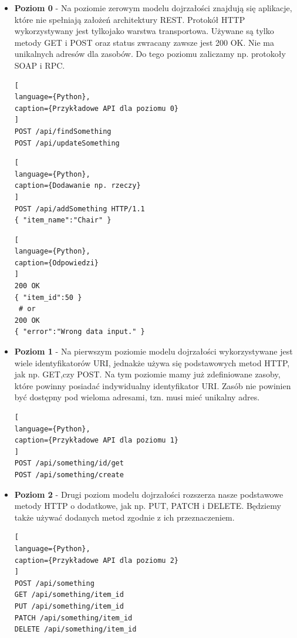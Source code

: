 \documentclass[oneside,polski,logo,indent]{amuthesis}
\begin{document}
\begin{itemize}
\item \textbf{Poziom 0} - Na poziomie zerowym modelu dojrzałości znajdują się aplikacje, które nie spełniają założeń architektury REST. Protokół HTTP wykorzystywany jest tylko\break jako warstwa transportowa. Używane są tylko metody GET i POST oraz status zwracany zawsze jest 200 OK. Nie ma unikalnych adresów dla zasobów. Do tego poziomu zaliczamy np. protokoły SOAP i RPC.

\begin{lstlisting}[
language={Python},
caption={Przykładowe API dla poziomu 0}
]
POST /api/findSomething
POST /api/updateSomething
\end{lstlisting}

\begin{lstlisting}[
language={Python},
caption={Dodawanie np. rzeczy}
]
POST /api/addSomething HTTP/1.1
{ "item_name":"Chair" }
\end{lstlisting}

\begin{lstlisting}[
language={Python},
caption={Odpowiedzi}
]
200 OK
{ "item_id":50 }
 # or
200 OK
{ "error":"Wrong data input." }
\end{lstlisting}

\item \textbf{Poziom 1} - Na pierwszym poziomie modelu dojrzałości wykorzystywane jest wiele identyfikatorów URI, jednakże używa się podstawowych metod HTTP, jak np. GET,\break czy POST. Na tym poziomie mamy już zdefiniowane zasoby, które powinny posiadać indywidualny identyfikator URI. Zasób nie powinien być dostępny pod wieloma adresami, tzn. musi mieć unikalny adres.

\begin{lstlisting}[
language={Python},
caption={Przykładowe API dla poziomu 1}
]
POST /api/something/id/get
POST /api/something/create
\end{lstlisting}

\item \textbf{Poziom 2} - Drugi poziom modelu dojrzałości rozszerza nasze podstawowe metody HTTP o dodatkowe, jak np. PUT, PATCH i DELETE. Będziemy także używać dodanych metod zgodnie z ich przeznaczeniem.

\begin{lstlisting}[
language={Python},
caption={Przykładowe API dla poziomu 2}
]
POST /api/something
GET /api/something/item_id
PUT /api/something/item_id
PATCH /api/something/item_id
DELETE /api/something/item_id
\end{lstlisting}


\end{itemize}
\end{document}
